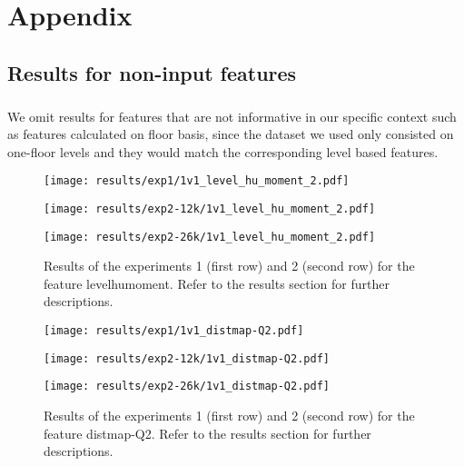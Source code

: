 \chapter{Appendix}
\section{Results for non-input features}
\paragraph{} We omit results for features that are not informative in our specific context such as features calculated on floor basis, since the dataset we used only consisted on one-floor levels and they would match the corresponding level based features.



\begin{figure}[h!]
	\centering
	\begin{minipage}{0.4\linewidth}
		\texttt{[image: results/exp1/1v1\_level\_hu\_moment\_2.pdf]}
	\end{minipage}
	
	\begin{minipage}{0.4\linewidth}
		\texttt{[image: results/exp2-12k/1v1\_level\_hu\_moment\_2.pdf]}
	\end{minipage}
	\begin{minipage}{0.4\linewidth}
		\texttt{[image: results/exp2-26k/1v1\_level\_hu\_moment\_2.pdf]}
	\end{minipage}
	
	\caption[ Results: Feature level\textunderscore hu\textunderscore moment]{ Results of the experiments 1 (first row) and 2 (second row) for the feature level\textunderscore hu\textunderscore moment. Refer to the results section for further descriptions. }
	\label{fig:appendix_level_hu_moment_2}
\end{figure}

\begin{figure}[h!]
	\centering
	\begin{minipage}{0.4\linewidth}
		\texttt{[image: results/exp1/1v1\_distmap-Q2.pdf]}
	\end{minipage}
	
	\begin{minipage}{0.4\linewidth}
		\texttt{[image: results/exp2-12k/1v1\_distmap-Q2.pdf]}
	\end{minipage}
	\begin{minipage}{0.4\linewidth}
		\texttt{[image: results/exp2-26k/1v1\_distmap-Q2.pdf]}
	\end{minipage}
	
	\caption[ Results: Feature distmap-Q2]{ Results of the experiments 1 (first row) and 2 (second row) for the feature distmap-Q2. Refer to the results section for further descriptions. }
	\label{fig:appendix_distmap-Q2}
\end{figure}
\newpage 


